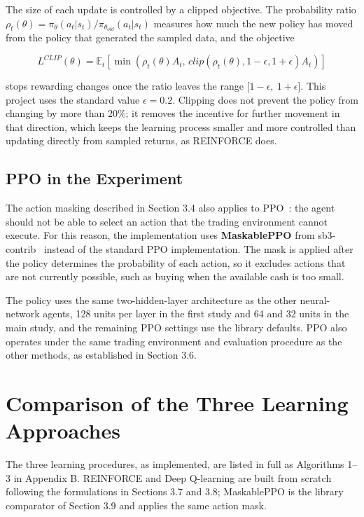 The size of each update is controlled by a clipped objective. The
probability ratio
\(\rho_{t}(\theta) = \pi_{\theta}\left( a_{t}|s_{t} \right) / \pi_{\theta_{old}}\left( a_{t}|s_{t} \right)\)
measures how much the new policy has moved from the policy that
generated the sampled data, and the objective

\[L^{CLIP}(\theta) = \mathbb{E}_{t}\left\lbrack \min\left( \rho_{t}(\theta)A_{t},\,{clip}\left( \rho_{t}(\theta),1 - \epsilon,1 + \epsilon \right)A_{t} \right) \right\rbrack\]

stops rewarding changes once the ratio leaves the range
\(\lbrack 1 - \epsilon,\ 1 + \epsilon\rbrack\). This project uses the
standard value \(\epsilon = 0.2\). Clipping does not prevent the policy
from changing by more than 20\%; it removes the incentive for further
movement in that direction, which keeps the learning process smaller and
more controlled than updating directly from sampled returns, as
REINFORCE does.

\subsection{PPO in the Experiment}

The action masking described in Section 3.4 also applies to
PPO~\cite{huang2022masking}: the agent should not be able to select an
action that the trading environment cannot execute. For this reason, the
implementation uses \textbf{MaskablePPO} from
sb3-contrib~\cite{raffin2021sb3} instead of the standard PPO
implementation. The mask is applied after the policy determines the
probability of each action, so it excludes actions that are not
currently possible, such as buying when the available cash is too small.

The policy uses the same two-hidden-layer architecture as the other
neural-network agents, 128 units per layer in the first study and 64 and
32 units in the main study, and the remaining PPO settings use the
library defaults. PPO also operates under the same trading environment
and evaluation procedure as the other methods, as established in
Section 3.6.

\section{Comparison of the Three Learning Approaches}

The three learning procedures, as implemented, are listed in full as
Algorithms 1--3 in Appendix B. REINFORCE and Deep Q-learning are built
from scratch following the formulations in Sections 3.7 and 3.8;
MaskablePPO is the library comparator of Section 3.9 and applies the
same action mask.

